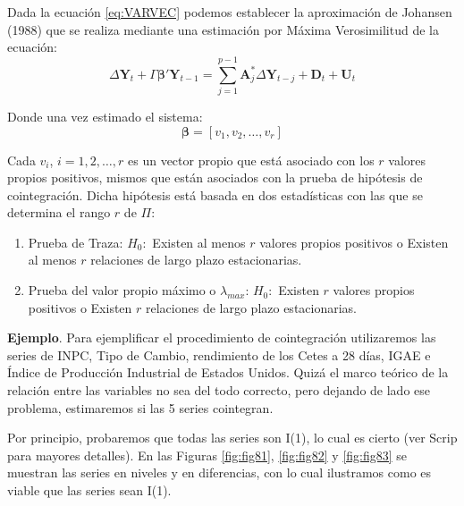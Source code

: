 \documentclass[
]{book}
\begin{document}
Dada la ecuación \eqref{eq:VARVEC} podemos establecer la aproximación de
Johansen (1988) que se realiza mediante una estimación por Máxima
Verosimilitud de la ecuación: \begin{equation}
    \Delta \mathbf{Y}_t + \Gamma \boldsymbol{\beta}' \mathbf{Y}_{t-1} = \sum_{j=1}^{p-1} \mathbf{A}^*_j \Delta \mathbf{Y}_{t-j} + \mathbf{D}_t + \mathbf{U}_t
\end{equation}

Donde una vez estimado el sistema: \begin{equation}
    \boldsymbol{\beta} = [v_1, v_2, \ldots, v_r]
\end{equation}

Cada \(v_i\), \(i = 1, 2, \ldots, r\) es un vector propio que está asociado
con los \(r\) valores propios positivos, mismos que están asociados con la
prueba de hipótesis de cointegración. Dicha hipótesis está basada en dos
estadísticas con las que se determina el rango \(r\) de \(\Pi\):

\begin{enumerate}
\def\labelenumi{\arabic{enumi}.}
\item
  Prueba de Traza: \(H_0 :\) Existen al menos \(r\) valores propios
  positivos o Existen al menos \(r\) relaciones de largo plazo
  estacionarias.
\item
  Prueba del valor propio máximo o \(\lambda_{max}\): \(H_0 :\) Existen
  \(r\) valores propios positivos o Existen \(r\) relaciones de largo
  plazo estacionarias.
\end{enumerate}

\textbf{Ejemplo}. Para ejemplificar el procedimiento de cointegración
utilizaremos las series de INPC, Tipo de Cambio, rendimiento de los
Cetes a 28 días, IGAE e Índice de Producción Industrial de Estados
Unidos. Quizá el marco teórico de la relación entre las variables no sea
del todo correcto, pero dejando de lado ese problema, estimaremos si las
5 series cointegran.

Por principio, probaremos que todas las series son I(1), lo cual es
cierto (ver Scrip para mayores detalles). En las Figuras
\ref{fig:fig81}, \ref{fig:fig82} y \ref{fig:fig83} se muestran las
series en niveles y en diferencias, con lo cual ilustramos como es
viable que las series sean I(1).
\end{document}
